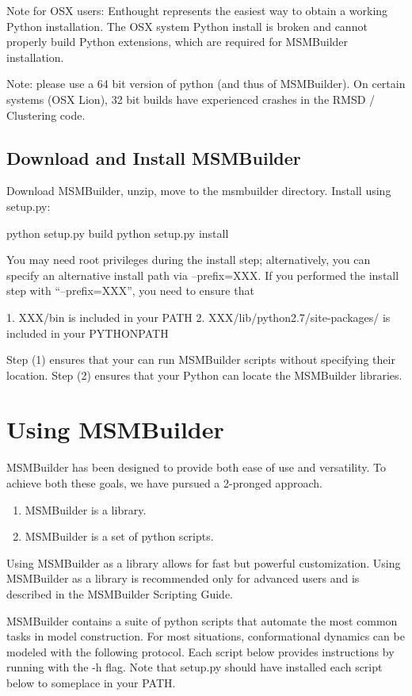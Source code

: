 \documentclass[12pt]{article}
\begin{document}
Note for OSX users: Enthought represents the easiest way to obtain a working Python installation.  The OSX system Python install is broken and cannot properly build Python extensions, which are required for MSMBuilder installation.

Note: please use a 64 bit version of python (and thus of MSMBuilder).  On certain systems (OSX Lion), 32 bit builds have experienced crashes in the RMSD / Clustering code.

\subsection{Download and Install MSMBuilder}

Download MSMBuilder, unzip, move to the msmbuilder directory.  Install using setup.py:

python setup.py build
python setup.py install

You may need root privileges during the install step; alternatively, you can specify an alternative install path via --prefix=XXX.  If you performed the install step with “--prefix=XXX”, you need to ensure that

1.  XXX/bin is included in your PATH
2.  XXX/lib/python2.7/site-packages/ is included in your PYTHONPATH

Step (1) ensures that your can run MSMBuilder scripts without specifying their location.  Step (2) ensures that your Python can locate the MSMBuilder libraries.  

\newpage

\section{Using MSMBuilder}

MSMBuilder has been designed to provide both ease of use and versatility.  To achieve both these goals, we have pursued a 2-pronged approach.

\begin{enumerate}
\item MSMBuilder is a library.
\item MSMBuilder is a set of python scripts.  
\end{enumerate}

Using MSMBuilder as a library allows for fast but powerful customization.  Using MSMBuilder as a library is recommended only for advanced users and is described in the MSMBuilder Scripting Guide.

MSMBuilder contains a suite of python scripts that automate the most common tasks in model construction.  For most situations, conformational dynamics can be modeled with the following protocol.  Each script below provides instructions by running with the -h flag.  Note that setup.py should have installed each script below to someplace in your PATH.  
\end{document}

